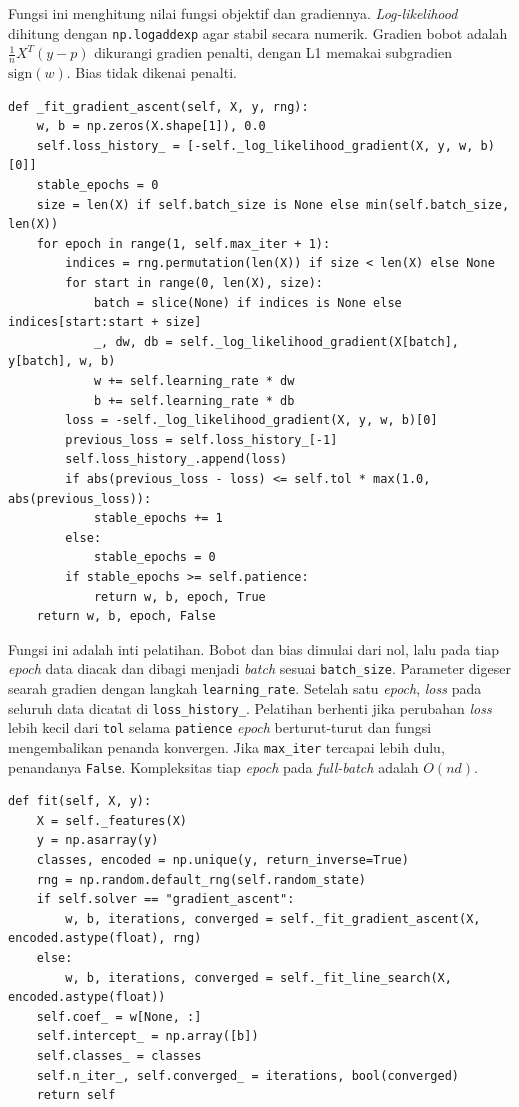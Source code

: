 Fungsi ini menghitung nilai fungsi objektif dan gradiennya. \textit{Log-likelihood}
dihitung dengan \texttt{np.logaddexp} agar stabil secara numerik. Gradien bobot
adalah $\frac{1}{n}X^{T}(y-p)$ dikurangi gradien penalti, dengan L1 memakai
subgradien $\mathrm{sign}(w)$. Bias tidak dikenai penalti.

\begin{lstlisting}
def _fit_gradient_ascent(self, X, y, rng):
    w, b = np.zeros(X.shape[1]), 0.0
    self.loss_history_ = [-self._log_likelihood_gradient(X, y, w, b)[0]]
    stable_epochs = 0
    size = len(X) if self.batch_size is None else min(self.batch_size, len(X))
    for epoch in range(1, self.max_iter + 1):
        indices = rng.permutation(len(X)) if size < len(X) else None
        for start in range(0, len(X), size):
            batch = slice(None) if indices is None else indices[start:start + size]
            _, dw, db = self._log_likelihood_gradient(X[batch], y[batch], w, b)
            w += self.learning_rate * dw
            b += self.learning_rate * db
        loss = -self._log_likelihood_gradient(X, y, w, b)[0]
        previous_loss = self.loss_history_[-1]
        self.loss_history_.append(loss)
        if abs(previous_loss - loss) <= self.tol * max(1.0, abs(previous_loss)):
            stable_epochs += 1
        else:
            stable_epochs = 0
        if stable_epochs >= self.patience:
            return w, b, epoch, True
    return w, b, epoch, False
\end{lstlisting}

Fungsi ini adalah inti pelatihan. Bobot dan bias dimulai dari nol, lalu pada
tiap \textit{epoch} data diacak dan dibagi menjadi \textit{batch} sesuai
\texttt{batch\_size}. Parameter digeser searah gradien dengan langkah
\texttt{learning\_rate}. Setelah satu \textit{epoch}, \textit{loss} pada seluruh
data dicatat di \texttt{loss\_history\_}. Pelatihan berhenti jika perubahan
\textit{loss} lebih kecil dari \texttt{tol} selama \texttt{patience}
\textit{epoch} berturut-turut dan fungsi mengembalikan penanda konvergen. Jika
\texttt{max\_iter} tercapai lebih dulu, penandanya \texttt{False}. Kompleksitas
tiap \textit{epoch} pada \textit{full-batch} adalah $O(nd)$.

\begin{lstlisting}
def fit(self, X, y):
    X = self._features(X)
    y = np.asarray(y)
    classes, encoded = np.unique(y, return_inverse=True)
    rng = np.random.default_rng(self.random_state)
    if self.solver == "gradient_ascent":
        w, b, iterations, converged = self._fit_gradient_ascent(X, encoded.astype(float), rng)
    else:
        w, b, iterations, converged = self._fit_line_search(X, encoded.astype(float))
    self.coef_ = w[None, :]
    self.intercept_ = np.array([b])
    self.classes_ = classes
    self.n_iter_, self.converged_ = iterations, bool(converged)
    return self
\end{lstlisting}

